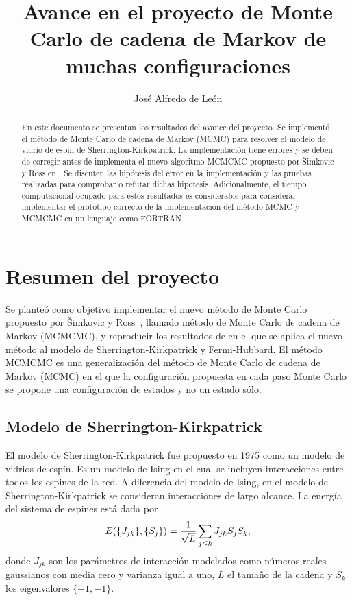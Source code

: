 \documentclass[letterpaper,superscriptaddress,aps,pra,nolongbibliography,twocolumn,showpacs,floatfix,10pt]{revtex4-2} %
\renewcommand{\>}{\rangle}
\newcommand{\<}{\langle}
\newcommand{\shk}{Sherrington-Kirkpatrick}
\newcommand{\syr}{Šimkovic y Ross}
\begin{document}
\title{Avance en el proyecto de
Monte Carlo de cadena de Markov de muchas configuraciones} 
\author{José Alfredo de León} 
\begin{abstract} %
En este documento se presentan los resultados del avance del proyecto. 
Se implementó el método de Monte Carlo de cadena de Markov (MCMC) 
para resolver el modelo de vidrio de espín de \shk{}. La
implementación tiene errores y se deben de corregir antes de 
implementa el nuevo algoritmo MCMCMC propuesto por \syr{} en 
\cite{simkovic2021manyconfiguration}. Se discuten las hipótesis del
error en la implementación y las pruebas realizadas para comprobar 
o refutar dichas hipotesis.
Adicionalmente, el tiempo computacional ocupado para estos 
resultados es considerable para considerar implementar el prototipo 
correcto de la implementación del método MCMC y MCMCMC en 
un lenguaje como FORTRAN.
\end{abstract} %
 
\maketitle

\section{Resumen del proyecto}
Se planteó como objetivo implementar el nuevo método de Monte Carlo propuesto
por \syr{}~\cite{simkovic2021manyconfiguration}, llamado método 
de Monte Carlo de cadena de Markov (MCMCMC), y reproducir los resultados 
de \cite{simkovic2021manyconfiguration} en el que se aplica el 
nuevo método al modelo de \shk{} y Fermi-Hubbard. El método MCMCMC 
es una generalización del método de Monte Carlo de cadena de Markov (MCMC) 
en el que la configuración propuesta en cada paso Monte Carlo se propone
una configuración de estados y no un estado sólo.

\subsection{Modelo de \shk{}}
El modelo de \shk{} fue propuesto en 1975 como un modelo de vidrios de espín.
Es un modelo de Ising en el cual se incluyen interacciones entre todos los 
espines de la red. A diferencia del modelo de Ising, en el modelo de \shk{}
se consideran interacciones de largo alcance.
La energía del sistema de espines está dada por 
\begin{align}\label{eq:SK:H}
E\qty(\{J_{jk}\},\{S_j\})=\frac{1}{\sqrt{L}}\sum_{j\leq k}J_{jk}S_jS_k,
\end{align}
donde $J_{jk}$ son los parámetros de interacción modelados como números reales
gaussianos con media cero y varianza igual a uno, $L$ el tamaño de la cadena y
$S_k$ los eigenvalores $\{+1,-1\}$. 
\end{document}
